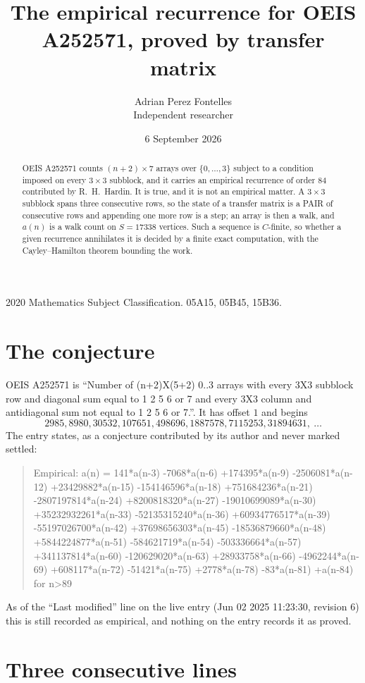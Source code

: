 \documentclass[11pt,a4paper]{article}
\title{The empirical recurrence for OEIS A252571, proved by transfer matrix}
\author{Adrian Perez Fontelles\\ \small Independent researcher}
\date{6 September 2026}
\theoremstyle{plain}
\theoremstyle{definition}
\begin{document}
\maketitle

\begin{abstract}
OEIS A252571 counts $(n+2)\times7$ arrays over $\{0,\dots,3\}$ subject to a condition imposed on
every $3\times3$ subblock, and it carries an empirical recurrence of order $84$
contributed by R.~H.~Hardin. It is true, and it is not an empirical matter. A $3\times3$
subblock spans three consecutive rows, so the state of a transfer matrix is a PAIR of
consecutive rows and appending one more row is a step; an array is then a walk, and
$a(n)$ is a walk count on $S=17338$ vertices. Such a sequence is $C$-finite, so whether a given
recurrence annihilates it is decided by a finite exact computation, with the Cayley--Hamilton
theorem bounding the work.
\end{abstract}

\noindent\small 2020 Mathematics Subject Classification. 05A15, 05B45, 15B36.\normalsize

\section{The conjecture}

OEIS A252571 is ``Number of (n+2)X(5+2) 0..3 arrays with every 3X3 subblock row and diagonal sum equal to 1 2 5 6 or 7 and every 3X3 column and antidiagonal sum not equal to 1 2 5 6 or 7.''. It has offset $1$ and begins
\[
2985, 8980, 30532, 107651, 498696, 1887578, 7115253, 31894631,\ \dots
\]
The entry states, as a conjecture contributed by its author and never marked settled:
\begin{quote}
Empirical: a(n) = 141*a(n-3) -7068*a(n-6) +174395*a(n-9) -2506081*a(n-12) +23429882*a(n-15) -154146596*a(n-18) +751684236*a(n-21) -2807197814*a(n-24) +8200818320*a(n-27) -19010699089*a(n-30) +35232932261*a(n-33) -52135315240*a(n-36) +60934776517*a(n-39) -55197026700*a(n-42) +37698656303*a(n-45) -18536879660*a(n-48) +5844224877*a(n-51) -584621719*a(n-54) -503336664*a(n-57) +341137814*a(n-60) -120629020*a(n-63) +28933758*a(n-66) -4962244*a(n-69) +608117*a(n-72) -51421*a(n-75) +2778*a(n-78) -83*a(n-81) +a(n-84) for n>89
\end{quote}
As of the ``Last modified'' line on the live entry (Jun 02 2025 11:23:30, revision 6) this is still
recorded as empirical, and nothing on the entry records it as proved.

\section{Three consecutive lines}
\end{document}
